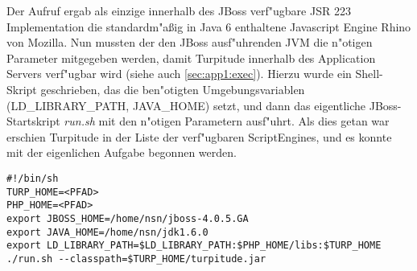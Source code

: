 Der Aufruf ergab als einzige innerhalb des JBoss verf"ugbare JSR 223 Implementation die standardm"a\ss ig in Java 6
enthaltene Javascript Engine Rhino von Mozilla. Nun mussten der den JBoss ausf"uhrenden JVM die n"otigen Parameter
mitgegeben werden, damit Turpitude innerhalb des Application Servers verf"ugbar wird (siehe auch \ref{sec:app1:exec}). 
Hierzu wurde ein Shell-Skript geschrieben, das die ben"otigten Umgebungsvariablen (LD\_LIBRARY\_PATH, JAVA\_HOME) setzt, 
und dann das eigentliche JBoss-Startskript \emph{run.sh} mit den n"otigen Parametern ausf"uhrt. 
Als dies getan war erschien Turpitude in der Liste der verf"ugbaren ScriptEngines, und es konnte mit der eigenlichen
Aufgabe begonnen werden.
\begin{lstlisting}[caption=JBoss Startskript]
#!/bin/sh
TURP_HOME=<PFAD>
PHP_HOME=<PFAD>
export JBOSS_HOME=/home/nsn/jboss-4.0.5.GA
export JAVA_HOME=/home/nsn/jdk1.6.0
export LD_LIBRARY_PATH=$LD_LIBRARY_PATH:$PHP_HOME/libs:$TURP_HOME
./run.sh --classpath=$TURP_HOME/turpitude.jar
\end{lstlisting}


